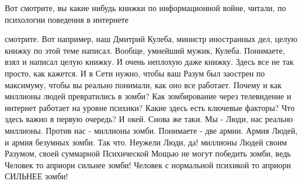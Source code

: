Вот смотрите, вы какие нибудь книжки по информационной войне, читали, по
психологии поведения в интернете

смотрите. Вот например, наш Дмитрий Кулеба, министр иностранных дел, целую
книжку по этой теме написал. Вообще, умнейший мужик, Кулеба. Понимаете, взял и
написал целую книжку. И очень неплохую даже книжку. Здесь все не так просто,
как кажется. И в Сети нужно, чтобы ваш Разум был заострен по максимуму, чтобы
вы реально понимали, как оно все работает. Почему и как миллионы людей
превратились в зомби? Как зомбирование через телевидение и интернет работает на
уровне психики? Какие здесь есть ключевые факторы? Что здесь важно в первую
очередь? И окей. Снова же таки. Мы - Люди, нас реально миллионы. Против нас -
миллионы зомби. Понимаете - две армии. Армия Людей, и армия безумных зомби. Так
что. Неужели Люди, да! миллионы Людей своим Разумом, своей суммарной
Психической Мощью не могут победить зомби, ведь Человек то априори сильнее
зомби! Человек с нормальной психикой то априори СИЛЬНЕЕ зомби!
